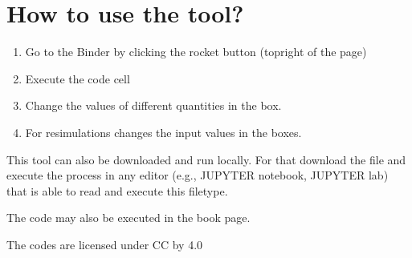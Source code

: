 \documentclass[letterpaper,10pt,english]{jupyterBook}
\begin{document}
\section{How to use the tool?}
\label{\detokenize{content/tools/aniso2D:how-to-use-the-tool}}\begin{enumerate}
%
\item {} 
\sphinxAtStartPar
Go to the Binder by clicking the rocket button (top\sphinxhyphen{}right of the page)

\item {} 
\sphinxAtStartPar
Execute the code cell

\item {} 
\sphinxAtStartPar
Change the values of different quantities in the box.

\item {} 
\sphinxAtStartPar
For re\sphinxhyphen{}simulations \sphinxhyphen{} changes the input values in the boxes.

\end{enumerate}

\sphinxAtStartPar
This tool can also be downloaded and run locally. For that download the  file and execute the process in any editor (e.g., JUPYTER notebook, JUPYTER lab) that is able to read and execute this file\sphinxhyphen{}type.

\sphinxAtStartPar
The code may also be executed in the book page.

\sphinxAtStartPar
The codes are licensed under CC by 4.0 
\end{document}
